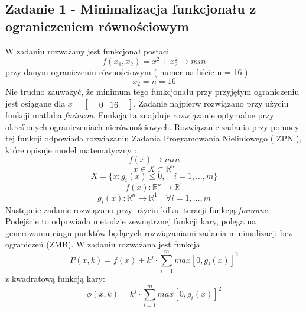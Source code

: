 \documentclass[a4paper,15pt]{article}
\begin{document}
\subsection{Zadanie 1 - Minimalizacja funkcjonału z ograniczeniem równościowym }
W zadaniu rozważany jest funkcjonał postaci 
\begin{equation*}
f(x_{1},x_{2})=x_{1}^{2}+x_{2}^{2} \rightarrow min
\end{equation*}  
przy danym ograniczeniu równościowym ( numer na liście n = 16 )
\begin{equation*}
x_{2} = n = 16 
\end{equation*}
Nie trudno zauważyć, że minimum tego funkcjonału przy przyjętym ograniczeniu jest osiągane dla 
\( x = \begin{bmatrix}
& 0 & 16 &
\end{bmatrix} \). 
Zadanie najpierw rozwiązano przy użyciu funkcji matlaba \textit{fmincon}. Funkcja ta znajduje rozwiązanie optymalne przy określonych ograniczeniach nierównościowych. Rozwiązanie zadania przy pomocy tej funkcji odpowiada rozwiązaniu Zadania Programowania Nieliniowego ( ZPN ), które opisuje model matematyczny :
\begin{equation*}
f(x) \rightarrow min
\end{equation*}
\begin{equation*}
x \in X \subset \mathbb{R}^{n}
\end{equation*} 
\begin{equation*}
X = \{ x: g_{i}(x) \leq 0 , \quad i = 1, \dotsc ,m \}
\end{equation*} 
\begin{equation*}
f(x): \mathbb{R}^{n} \rightarrow \mathbb{R}^{1}
\end{equation*}
\begin{equation*}
g_{i}(x): \mathbb{R}^{n} \rightarrow \mathbb{R}^{1} \quad \forall i = 1, \dotsc ,m
\end{equation*}
Następnie zadanie rozwiązano przy użyciu kilku iteracji funkcją \textit{fminunc}. Podejście to odpowiada metodzie zewnętrznej funkcji kary, polega na generowaniu ciągu punktów będących rozwiązaniami zadania minimalizacji bez ograniczeń (ZMB). W zadaniu rozważana jest funkcja 
\begin{equation*}
P(x,k)=f(x)+ k^{j} \cdot \sum_{i=1}^{m}max[0, g_{i}(x)]^{2}
\end{equation*}
z kwadratową funkcją kary:
\begin{equation*}
\phi(x,k) = k^{j} \cdot \sum_{i=1}^{m}max[0, g_{i}(x)]^{2}
\end{equation*}
\end{document}

